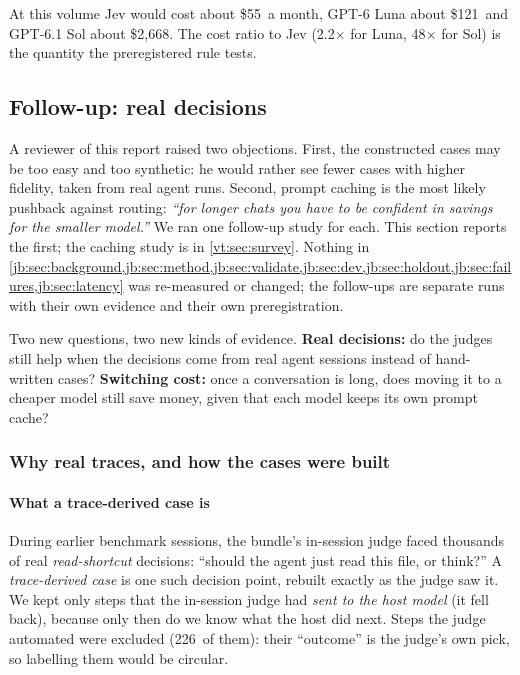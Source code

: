 \documentclass[11pt,letterpaper]{article}
\newcommand{\term}[1]{\emph{#1}}
\newcommand{\JevProjUSD}{55}
\newcommand{\LunaHoldCostX}{2.2}
\newcommand{\LunaProjUSD}{121}
\newcommand{\SolHoldCostX}{48}
\newcommand{\SolProjUSD}{2{,}668}
\newcommand{\TrFastRouted}{226}
\begin{document}
At this volume Jev would cost about \$\JevProjUSD\ a month, GPT-6 Luna about \$\LunaProjUSD\ and
GPT-6.1 Sol about \$\SolProjUSD. The cost ratio to Jev (\LunaHoldCostX$\times$ for Luna,
\SolHoldCostX$\times$ for Sol) is the quantity the preregistered rule tests.
\subsection{Follow-up: real decisions}\label{jb:sec:followup}

A reviewer of this report raised two objections. First, the constructed cases may be too easy and too
synthetic: he would rather see fewer cases with higher fidelity, taken from real agent runs. Second, prompt
caching is the most likely pushback against routing: \emph{``for longer chats you have to be confident in
savings for the smaller model.''} We ran one follow-up study for each. This section reports the first; the caching study is in \cref{vt:sec:survey}. Nothing in
\cref{jb:sec:background,jb:sec:method,jb:sec:validate,jb:sec:dev,jb:sec:holdout,jb:sec:failures,jb:sec:latency} was
re-measured or changed; the follow-ups are separate runs with their own evidence and their own
preregistration.

\begin{keyidea}
Two new questions, two new kinds of evidence. \textbf{Real decisions:} do the judges still help when the
decisions come from real agent sessions instead of hand-written cases? \textbf{Switching cost:} once a
conversation is long, does moving it to a cheaper model still save money, given that each model keeps its
own prompt cache?
\end{keyidea}

\subsubsection{Why real traces, and how the cases were built}\label{jb:sec:traces}

\paragraph{What a trace-derived case is} During earlier benchmark sessions, the bundle's in-session judge
faced thousands of real \emph{read-shortcut} decisions: ``should the agent just read this file, or think?''
A \term{trace-derived case} is one such decision point, rebuilt exactly as the judge saw it. We kept only
steps that the in-session judge had \emph{sent to the host model} (it fell back), because only then do we
know what the host did next. Steps the judge automated were excluded (\TrFastRouted\ of them): their
``outcome'' is the judge's own pick, so labelling them would be circular.
\end{document}
